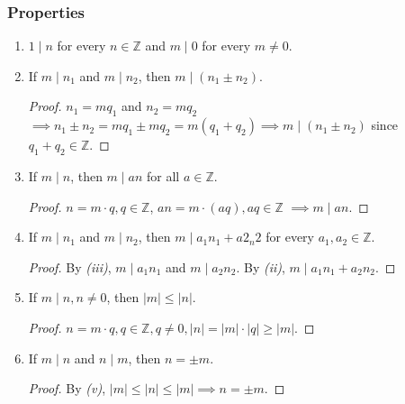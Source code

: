\documentclass{article}
\newcommand{\Z}{\mathbb{Z}}
\begin{document}
\subsubsection{Properties}
\begin{enumerate}[label=\textit{(\roman*)}]
    \item $1 \mid n$ for every $n \in \Z$ and $m \mid 0$ for every $m \neq 0$.
    \item If $m \mid n_1$ and $m \mid n_2$, then $m \mid (n_1 \pm n_2)$.
        \begin{proof}
            $n_1 = mq_1$ and $n_2 = mq_2$
            \newline
            $\implies n_1 \pm n_2 = mq_1 \pm mq_2 = m(q_1 + q_2) \implies m \mid (n_1 \pm n_2)$ since
            $q_1 + q_2 \in \Z$.
        \end{proof}
    \item If $m \mid n$, then $m \mid an$ for all $a \in \Z$.
        \begin{proof}
            $n = m \cdot q, q \in \Z$, $an = m \cdot (aq), aq \in \Z$
            $\implies m \mid an$.
        \end{proof}
    \item If $m \mid n_1$ and $m \mid n_2$, then $m \mid a_1n_1 + a2_n2$ for every $a_1, a_2 \in \Z$.
        \begin{proof}
            By \textit{(iii)}, $m \mid a_1n_1$ and $m \mid a_2n_2$. 
            By \textit{(ii)}, $m \mid a_1n_1 + a_2n_2$.
        \end{proof}
    \item If $m \mid n, n \neq 0$, then $|m| \leq |n|$.
        \begin{proof}
            $n = m \cdot q, q \in \Z, q \neq 0, |n| = |m| \cdot |q| \geq |m|$.
        \end{proof}
    \item If $m \mid n$ and $n \mid m$, then $n = \pm m$.
        \begin{proof}
            By \textit{(v)}, $|m| \leq |n| \leq |m| \implies n = \pm m$.
        \end{proof}
\end{enumerate}
\end{document}
